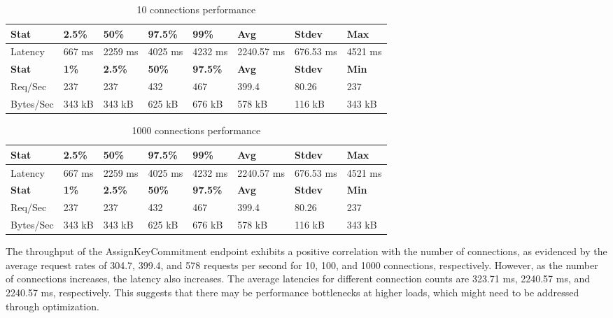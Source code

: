 \documentclass[../Main.tex]{subfiles}
\begin{document}
\begin{table}[H]
  \centering
\begin{tabular}{|l|l|l|l|l|l|l|l|}
\hline
\rowcolor[HTML]{f56b00}
\textbf{Stat} & \textbf{2.5\%} & \textbf{50\%} & \textbf{97.5\%} & \textbf{99\%} & \textbf{Avg} & \textbf{Stdev} & \textbf{Max} \\
\hline
Latency & 667 ms & 2259 ms & 4025 ms & 4232 ms & 2240.57 ms & 676.53 ms & 4521 ms \\
\hline
\rowcolor[HTML]{f56b00}
\textbf{Stat} & \textbf{1\%} & \textbf{2.5\%} & \textbf{50\%} & \textbf{97.5\%} & \textbf{Avg} & \textbf{Stdev} & \textbf{Min} \\
\hline
Req/Sec & 237 & 237 & 432 & 467 & 399.4 & 80.26 & 237 \\
Bytes/Sec & 343 kB & 343 kB & 625 kB & 676 kB & 578 kB & 116 kB & 343 kB \\
\hline
\end{tabular}
 \caption{10 connections performance}
 \label{10-connections-performance}
\end{table}

\begin{table}[H]
  \centering
\begin{tabular}{|l|l|l|l|l|l|l|l|}
\hline
\rowcolor[HTML]{f56b00}
\textbf{Stat} & \textbf{2.5\%} & \textbf{50\%} & \textbf{97.5\%} & \textbf{99\%} & \textbf{Avg} & \textbf{Stdev} & \textbf{Max} \\
\hline
Latency & 667 ms & 2259 ms & 4025 ms & 4232 ms & 2240.57 ms & 676.53 ms & 4521 ms \\
\hline
\rowcolor[HTML]{f56b00}
\textbf{Stat} & \textbf{1\%} & \textbf{2.5\%} & \textbf{50\%} & \textbf{97.5\%} & \textbf{Avg} & \textbf{Stdev} & \textbf{Min} \\
\hline
Req/Sec & 237 & 237 & 432 & 467 & 399.4 & 80.26 & 237 \\
Bytes/Sec & 343 kB & 343 kB & 625 kB & 676 kB & 578 kB & 116 kB & 343 kB \\
\hline
\end{tabular}
 \caption{1000 connections performance}
 \label{1000-connections-performance}
\end{table}

\indent The throughput of the AssignKeyCommitment endpoint exhibits a positive correlation with the number of connections, as evidenced by the average request rates of 304.7, 399.4, and 578 requests per second for 10, 100, and 1000 connections, respectively. However, as the number of connections increases, the latency also increases. The average latencies for different connection counts are 323.71 ms, 2240.57 ms, and 2240.57 ms, respectively. This suggests that there may be performance bottlenecks at higher loads, which might need to be addressed through optimization.
\end{document}
